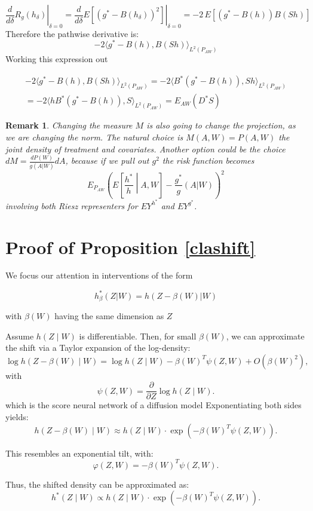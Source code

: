 \documentclass[12pt]{article}
\theoremstyle{thmstyleone}%
\theoremstyle{thmstyletwo}%
\newtheorem{rem}{Remark}%
\theoremstyle{thmstylethree}%
\begin{document}
$$\left. \frac{d}{d\delta} R_{g}(h_\delta) \right|_{\delta=0}
= \left. \frac{d}{d\delta}{E}[(g^* - B(h_\delta))^2] \right|_{\delta=0}  = -2 \, {E}[(g^* - B(h)) B(Sh)]$$
Therefore the pathwise derivative is:
$$ -2 \langle g^* - B(h), B(S h) \rangle_{L^2(P_{AW})}$$
Working this expression out

$$\begin{aligned}-2 \langle g^* - B(h), B(S h) \rangle_{L^2(P_{AW})}  =  -2 \langle B^*(g^* - B(h)), S h \rangle_{L^2(P_{AW})}  \\= -2 \langle  hB^*(g^* - B(h)), S \rangle_{L^2(P_{AW})} = E_{AW}(D^*S)\end{aligned} $$

\begin{rem}
	Changing the measure $M$ is also going to change the projection, as we are changing the norm. The natural choice is $M(A,W)=P(A,W)$ the joint density of treatment and covariates. Another option could be the choice $dM =\frac{dP(W)}{g(A|W)}dA$, because if we pull out $g^2$ the risk function becomes $$E_{P_{AW}}\left(E\left[\frac{h^*}{h} \middle| A,W\right]-\frac{g^*}{g}\left(A|W\right) \right)^2$$ involving both Riesz representers for $EY^{h^*}$ and $EY^{g^*}$. 
\end{rem}

\section{Proof of Proposition \ref{clashift}}


We focus our attention in interventions of the form \cite{diaz} 

$$h^*_\beta(Z|W) = h(Z - \beta(W)|W)$$

with $\beta(W)$ having the same dimension as $Z$

Assume $h(Z \mid W)$ is differentiable. Then, for small $\beta(W)$, we can approximate the shift via a Taylor expansion of the log-density:
\[
\log h(Z - \beta(W) \mid W) = \log h(Z \mid W) - \beta(W) ^T \psi(Z,W) + O(\beta(W)^2),
\]
with
\[
\psi(Z,W) = \frac{\partial}{\partial Z} \log h(Z \mid W).
\]
which is the score neural network of a diffusion model \cite{feng2024optimalconvexmestimationscore}
Exponentiating both sides yields:
\[
h(Z - \beta(W) \mid W) \approx h(Z \mid W) \cdot \exp\left( - \beta(W) ^T \psi(Z,W) \right).
\]

This resembles an exponential tilt, with:
\[
\varphi(Z, W) = - \beta(W) ^T  \psi(Z,W).
\]

Thus, the shifted density can be approximated as:
\[
h^*(Z \mid W) \propto h(Z \mid W) \cdot \exp\left( -\beta(W)^T\psi(Z,W) \right).
\]
\end{document}
